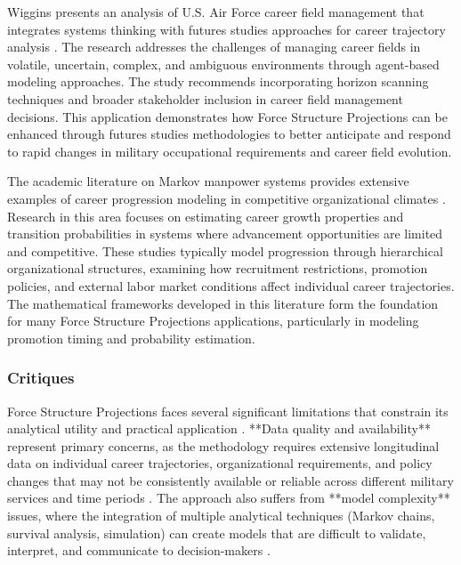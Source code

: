 \documentclass[main.tex]{subfiles}
\begin{document}
Wiggins presents an analysis of U.S. Air Force career field management that integrates systems thinking with futures studies approaches for career trajectory analysis \parencite{air_force_career}. The research addresses the challenges of managing career fields in volatile, uncertain, complex, and ambiguous environments through agent-based modeling approaches. The study recommends incorporating horizon scanning techniques and broader stakeholder inclusion in career field management decisions. This application demonstrates how Force Structure Projections can be enhanced through futures studies methodologies to better anticipate and respond to rapid changes in military occupational requirements and career field evolution.

The academic literature on Markov manpower systems provides extensive examples of career progression modeling in competitive organizational climates \parencite{markov_career_progression}. Research in this area focuses on estimating career growth properties and transition probabilities in systems where advancement opportunities are limited and competitive. These studies typically model progression through hierarchical organizational structures, examining how recruitment restrictions, promotion policies, and external labor market conditions affect individual career trajectories. The mathematical frameworks developed in this literature form the foundation for many Force Structure Projections applications, particularly in modeling promotion timing and probability estimation.

\subsubsection{Critiques}

Force Structure Projections faces several significant limitations that constrain its analytical utility and practical application \parencite{manpower_simulation,retention_analysis}. **Data quality and availability** represent primary concerns, as the methodology requires extensive longitudinal data on individual career trajectories, organizational requirements, and policy changes that may not be consistently available or reliable across different military services and time periods \parencite{retention_analysis}. The approach also suffers from **model complexity** issues, where the integration of multiple analytical techniques (Markov chains, survival analysis, simulation) can create models that are difficult to validate, interpret, and communicate to decision-makers \parencite{eisler_allen}.
\end{document}
